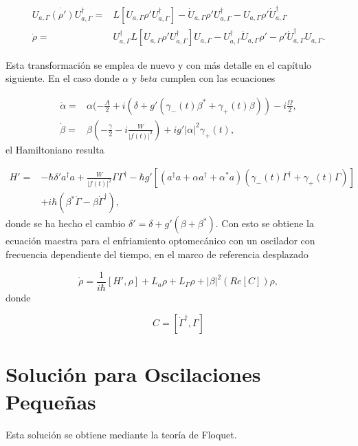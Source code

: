 \documentclass[10pt,a4paper]{report}
\begin{document}
\begin{align}
 U_{a,\Gamma} \dot{(\rho')} U_{a,\Gamma}^\dagger =& L[U_{a,\Gamma} \rho' U_{a,\Gamma}^\dagger] - \dot{U}_{a,\Gamma}\rho'U_{a,\Gamma}^\dagger -U_{a,\Gamma} \rho' \dot{U}_{a,\Gamma}^\dagger\\
\dot{\rho} =& U_{a,\Gamma}^\dagger L[U_{a,\Gamma} \rho' U_{a,\Gamma}^\dagger]U_{a,\Gamma}-U_{a,\Gamma}^\dagger\dot{U}_{a,\Gamma}\rho'-\rho'\dot{U}_{a,\Gamma}^\dagger U_{a,\Gamma}.
\end{align}

Esta transformación se emplea de nuevo y con más detalle en el capítulo siguiente. En el caso donde $\alpha$ y $beta$ cumplen con las ecuaciones

\begin{align}
\dot{\alpha} =& \alpha(-\frac{A}{2}+i(\delta+g'(\gamma_-(t) \beta^* + \gamma_+(t) \beta))-i\frac{\Omega}{2},\\
\dot{\beta} =& \beta(-\frac{\gamma}{2}-i\frac{W}{|f(t)|^2})+ig'|\alpha|^2\gamma_+(t),
\end{align} el Hamiltoniano resulta


\begin{align*}
H'=& -\hbar \delta' a^\dagger a + \frac{W}{|f(t)|^2}\Gamma \Gamma^\dagger -\hbar g'[(a^{\dagger}a +\alpha a^{\dagger}+\alpha^* a)(\gamma_-(t)\Gamma^{\dagger}+\gamma_+(t)\Gamma)]\\
&+ i\hbar(\beta^*\dot{\Gamma} - \beta \dot{\Gamma}^\dagger),
\end{align*}  donde se ha hecho el cambio $\delta' = \delta + g'(\beta + \beta^*)$. Con esto se obtiene la ecuación maestra para el enfriamiento optomecánico con un oscilador con frecuencia dependiente del tiempo, en el marco de referencia desplazado


\begin{equation}\label{DLCMasterEquation}
\dot{\rho} = \frac{1}{i\hbar}[H',\rho] + L_a\rho + L_\Gamma\rho + |\beta|^2(Re[C])\rho,
\end{equation} donde 

\begin{equation}
C = [\dot{\Gamma}^\dagger, \Gamma]
\end{equation} 

\section{Solución para Oscilaciones Pequeñas}

Esta solución se obtiene mediante la teoría de Floquet. \cite{TesisMaestria} 
\end{document}
